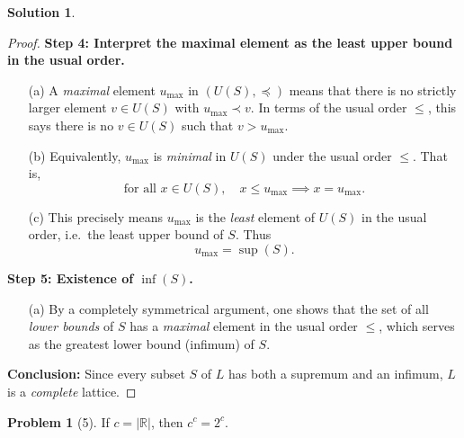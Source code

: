 \documentclass[12pt]{article}
\theoremstyle{definition} %
\newtheorem{solution}{Solution}
\newtheorem{problem}{Problem}
\theoremstyle{plain} %
\begin{document}
\begin{solution}
\begin{proof}
            \vspace{0.3cm}
            \textbf{Step 4: Interpret the maximal element as the least upper bound in the usual order.}
            \begin{enumerate}
                \item[(a)] A \emph{maximal} element $u_{\mathrm{max}}$ in $(U(S), \preceq)$ means that there is no strictly larger element $v \in U(S)$ with $u_{\mathrm{max}} \prec v$. In terms of the usual order $\le$, this says there is no $v \in U(S)$ such that $v > u_{\mathrm{max}}$.
                \item[(b)] Equivalently, $u_{\mathrm{max}}$ is \emph{minimal} in $U(S)$ under the usual order $\le$. That is,
                \[
                   \text{for all } x \in U(S), \quad x \le u_{\mathrm{max}} \implies x = u_{\mathrm{max}}.
                \]
                \item[(c)] This precisely means $u_{\mathrm{max}}$ is the \emph{least} element of $U(S)$ in the usual order, i.e.\ the least upper bound of $S$. Thus 
                \[
                   u_{\mathrm{max}} = \sup(S).
                \]
            \end{enumerate}
            
            \vspace{0.3cm}
            \textbf{Step 5: Existence of $\inf(S)$.}
            \begin{enumerate}
                \item[(a)] By a completely symmetrical argument, one shows that the set of all \emph{lower bounds} of $S$ has a \emph{maximal} element in the usual order $\le$, which serves as the greatest lower bound (infimum) of $S$.
            \end{enumerate}
            
            \vspace{0.3cm}
            \textbf{Conclusion:} 
            Since every subset $S$ of $L$ has both a supremum and an infimum, $L$ is a \emph{complete} lattice.
            
            \end{proof}

    \end{solution}
        \begin{problem}[5]
            \label{thm:cc_equals_2c}
            If $c = |\mathbb{R}|$, then $c^c = 2^c$.
        \end{problem}
\end{document}
